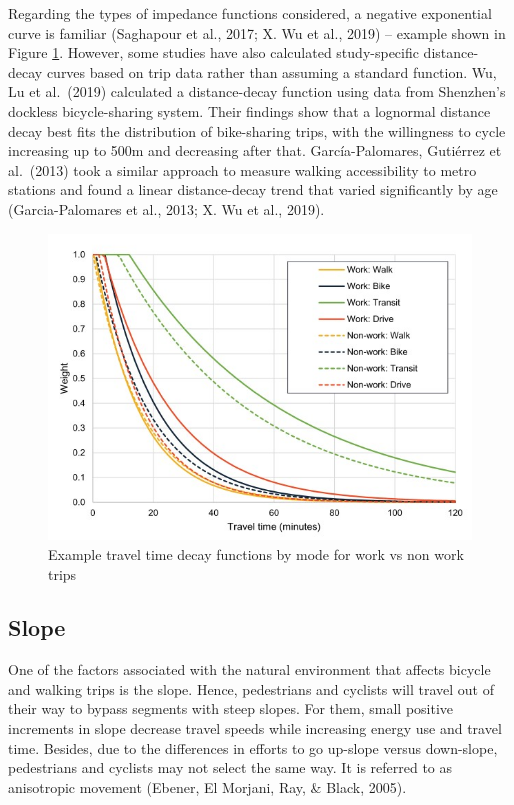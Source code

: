 \documentclass[12pt,twoside]{reedthesis}
\begin{document}
Regarding the types of impedance functions considered, a negative exponential curve is familiar (Saghapour et al., 2017; X. Wu et al., 2019) -- example shown in Figure \ref{fig:initiative}. However, some studies have also calculated study-specific distance-decay curves based on trip data rather than assuming a standard function. Wu, Lu et al.~(2019) calculated a distance-decay function using data from Shenzhen's dockless bicycle-sharing system. Their findings show that a lognormal distance decay best fits the distribution of bike-sharing trips, with the willingness to cycle increasing up to 500m and decreasing after that. García-Palomares, Gutiérrez et al.~(2013) took a similar approach to measure walking accessibility to metro stations and found a linear distance-decay trend that varied significantly by age (Garcia-Palomares et al., 2013; X. Wu et al., 2019).
\begin{figure}

{\centering \includegraphics[width=0.9\linewidth]{images/Fig.2} 

}

\caption{Example travel time decay functions by mode for work vs non work trips}\label{fig:initiative}
\end{figure}
\hypertarget{slope}{%
\subsection{Slope}\label{slope}}

One of the factors associated with the natural environment that affects bicycle and walking trips is the slope. Hence, pedestrians and cyclists will travel out of their way to bypass segments with steep slopes. For them, small positive increments in slope decrease travel speeds while increasing energy use and travel time. Besides, due to the differences in efforts to go up-slope versus down-slope, pedestrians and cyclists may not select the same way. It is referred to as anisotropic movement (Ebener, El Morjani, Ray, \& Black, 2005).
\end{document}
